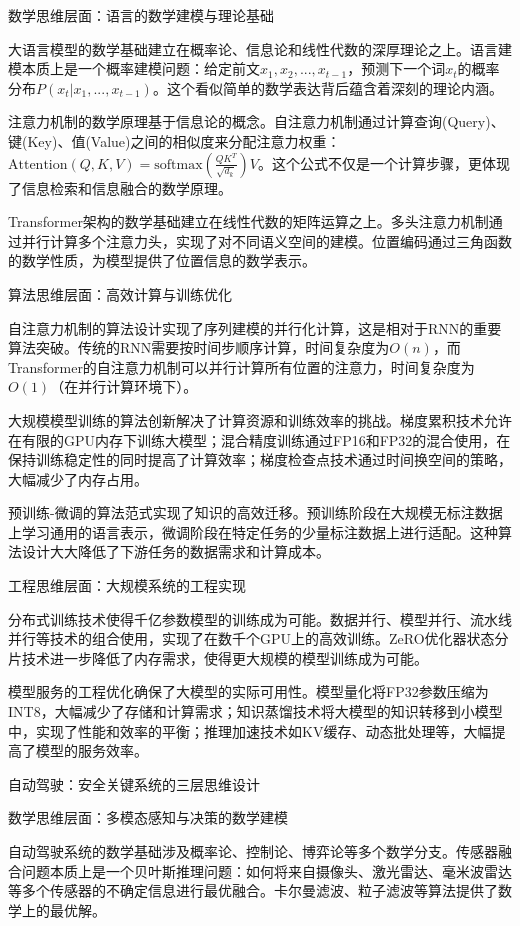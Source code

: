 数学思维层面：语言的数学建模与理论基础

大语言模型的数学基础建立在概率论、信息论和线性代数的深厚理论之上。语言建模本质上是一个概率建模问题：给定前文$x_1, x_2, ..., x_{t-1}$，预测下一个词$x_t$的概率分布$P(x_t|x_1, ..., x_{t-1})$。这个看似简单的数学表达背后蕴含着深刻的理论内涵。

注意力机制的数学原理基于信息论的概念。自注意力机制通过计算查询(Query)、键(Key)、值(Value)之间的相似度来分配注意力权重：$\text{Attention}(Q,K,V) = \text{softmax}(\frac{QK^T}{\sqrt{d_k}})V$。这个公式不仅是一个计算步骤，更体现了信息检索和信息融合的数学原理。

Transformer架构的数学基础建立在线性代数的矩阵运算之上。多头注意力机制通过并行计算多个注意力头，实现了对不同语义空间的建模。位置编码通过三角函数的数学性质，为模型提供了位置信息的数学表示。

算法思维层面：高效计算与训练优化

自注意力机制的算法设计实现了序列建模的并行化计算，这是相对于RNN的重要算法突破。传统的RNN需要按时间步顺序计算，时间复杂度为$O(n)$，而Transformer的自注意力机制可以并行计算所有位置的注意力，时间复杂度为$O(1)$（在并行计算环境下）。

大规模模型训练的算法创新解决了计算资源和训练效率的挑战。梯度累积技术允许在有限的GPU内存下训练大模型；混合精度训练通过FP16和FP32的混合使用，在保持训练稳定性的同时提高了计算效率；梯度检查点技术通过时间换空间的策略，大幅减少了内存占用。

预训练-微调的算法范式实现了知识的高效迁移。预训练阶段在大规模无标注数据上学习通用的语言表示，微调阶段在特定任务的少量标注数据上进行适配。这种算法设计大大降低了下游任务的数据需求和计算成本。

工程思维层面：大规模系统的工程实现

分布式训练技术使得千亿参数模型的训练成为可能。数据并行、模型并行、流水线并行等技术的组合使用，实现了在数千个GPU上的高效训练。ZeRO优化器状态分片技术进一步降低了内存需求，使得更大规模的模型训练成为可能。

模型服务的工程优化确保了大模型的实际可用性。模型量化将FP32参数压缩为INT8，大幅减少了存储和计算需求；知识蒸馏技术将大模型的知识转移到小模型中，实现了性能和效率的平衡；推理加速技术如KV缓存、动态批处理等，大幅提高了模型的服务效率。

自动驾驶：安全关键系统的三层思维设计

数学思维层面：多模态感知与决策的数学建模

自动驾驶系统的数学基础涉及概率论、控制论、博弈论等多个数学分支。传感器融合问题本质上是一个贝叶斯推理问题：如何将来自摄像头、激光雷达、毫米波雷达等多个传感器的不确定信息进行最优融合。卡尔曼滤波、粒子滤波等算法提供了数学上的最优解。

